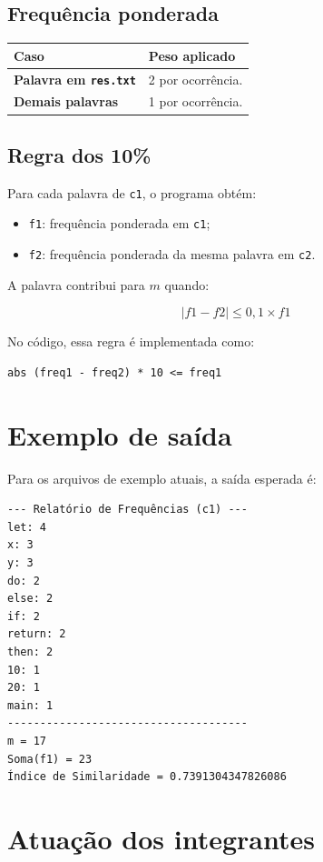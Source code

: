 \documentclass[12pt,a4paper]{article}
\newcommand{\arquivo}[1]{\texttt{#1}}
\begin{document}
\subsection{Frequência ponderada}

\begin{tabularx}{\textwidth}{>{\bfseries}p{5cm}X}
\toprule
Caso & Peso aplicado \\
\midrule
Palavra em \arquivo{res.txt} & 2 por ocorrência. \\
Demais palavras & 1 por ocorrência. \\
\bottomrule
\end{tabularx}

\subsection{Regra dos 10\%}

Para cada palavra de \arquivo{c1}, o programa obtém:

\begin{itemize}[leftmargin=1.2cm]
    \item \arquivo{f1}: frequência ponderada em \arquivo{c1};
    \item \arquivo{f2}: frequência ponderada da mesma palavra em \arquivo{c2}.
\end{itemize}

A palavra contribui para \(m\) quando:

\[
|f1 - f2| \leq 0{,}1 \times f1
\]

No código, essa regra é implementada como:

\begin{lstlisting}
abs (freq1 - freq2) * 10 <= freq1
\end{lstlisting}

\section{Exemplo de saída}

Para os arquivos de exemplo atuais, a saída esperada é:

\begin{lstlisting}
--- Relatório de Frequências (c1) ---
let: 4
x: 3
y: 3
do: 2
else: 2
if: 2
return: 2
then: 2
10: 1
20: 1
main: 1
-------------------------------------
m = 17
Soma(f1) = 23
Índice de Similaridade = 0.7391304347826086
\end{lstlisting}

\section{Atuação dos integrantes}
\end{document}
